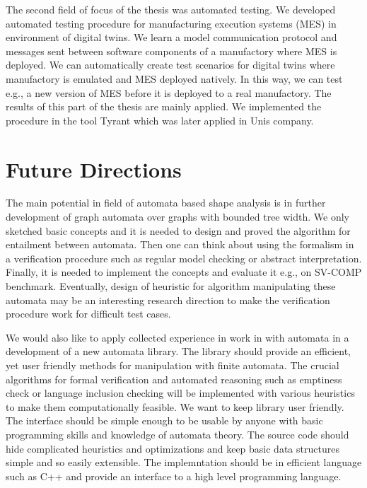 {The second field of focus of the thesis was automated testing.
We developed automated testing procedure for manufacturing execution systems (MES)
in environment of digital twins.
We learn a model communication protocol and messages sent between software components
of a manufactory where MES is deployed.
We can automatically create test scenarios for digital twins where manufactory is emulated
and MES deployed natively.
In this way, we can test e.g., a new version of MES before it is deployed to a real manufactory.
The results of this part of the thesis are mainly applied.
We implemented the procedure in the tool Tyrant \cite{ref_tyrant} which was later applied
in Unis company.

\section{Future Directions}
The main potential in field of automata based shape analysis is in further development
of graph automata over graphs with bounded tree width.
We only sketched basic concepts and it is needed to design and proved the algorithm
for entailment between automata.
Then one can think about using the formalism in a verification procedure such as
regular model checking or abstract interpretation.
Finally, it is needed to implement the concepts and evaluate it e.g., on SV-COMP
benchmark.
Eventually, design of heuristic for algorithm manipulating these automata may be
an interesting research direction to make the verification procedure work for
difficult test cases.

We would also like to apply collected experience in work in with automata
in a development of a new automata library.
The library should provide an efficient, yet user friendly methods for
manipulation with finite automata.
The crucial algorithms for formal verification and automated reasoning
such as emptiness check or language inclusion checking will be implemented
with various heuristics to make them computationally feasible.
We want to keep library user friendly.
The interface should be simple enough to be usable by anyone with basic
programming skills and knowledge of automata theory.
The source code should hide complicated heuristics and optimizations
and keep basic data structures simple and so easily extensible.
The implemntation should be in efficient language such as C++ and provide
an interface to a high level programming language.

}
